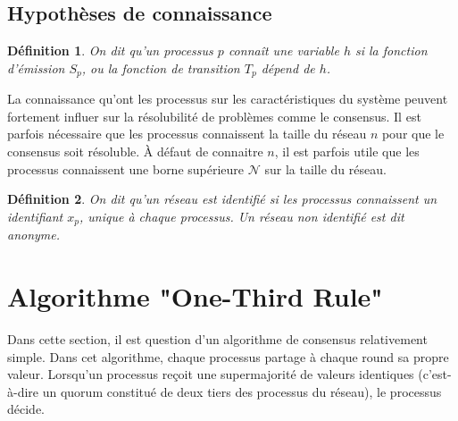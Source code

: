 \documentclass{article}
\newtheorem{definition}{Définition}
\begin{document}
\subsection{Hypothèses de connaissance}

\begin{definition}
	On dit qu'un processus $p$ \textit{connaît} une variable $h$ si la fonction d'émission $S_p$, ou la fonction de transition $T_p$ dépend de $h$. 
\end{definition}

La connaissance qu'ont les processus sur les caractéristiques du système peuvent fortement influer sur la résolubilité de problèmes comme le consensus.
Il est parfois nécessaire que les processus connaissent la taille du réseau $n$ pour que le consensus soit résoluble.
À défaut de connaitre $n$, il est parfois utile que les processus connaissent une borne supérieure $\mathcal{N}$ sur la taille du réseau.

\begin{definition}
	On dit qu'un réseau est \textit{identifié} si les processus connaissent un identifiant $x_p$, unique à chaque processus.
	Un réseau non identifié est dit \textit{anonyme}.
\end{definition}

\section{Algorithme "One-Third Rule"}

Dans cette section, il est question d'un algorithme de consensus relativement simple. Dans cet algorithme, chaque processus partage à chaque round sa propre valeur.
Lorsqu'un processus reçoit une supermajorité de valeurs identiques (c'est-à-dire un quorum constitué de deux tiers des processus du réseau), le processus décide.
\end{document}
